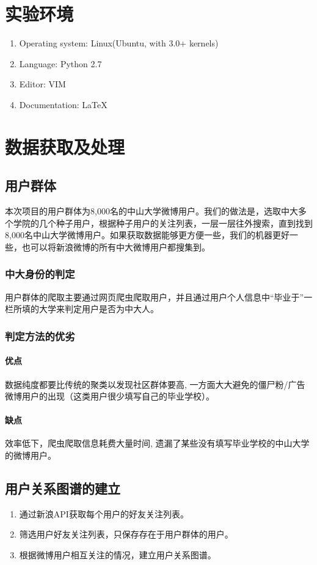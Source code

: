 \documentclass[a4paper]{article}
\begin{document}
\section{实验环境}
\begin{enumerate}
    \item Operating system: Linux(Ubuntu, with 3.0+ kernels)
    \item Language: Python 2.7
    \item Editor: VIM
    \item Documentation: \LaTeX
\end{enumerate}



\section{数据获取及处理}
\subsection{用户群体}
本次项目的用户群体为8,000名的中山大学微博用户。我们的做法是，选取中大多个学院的几个种子用户，根据种子用户的关注列表，一层一层往外搜索，直到找到8,000名中山大学微博用户。如果获取数据能够更方便一些，我们的机器更好一些，也可以将新浪微博的所有中大微博用户都搜集到。
\subsubsection{中大身份的判定}
用户群体的爬取主要通过网页爬虫爬取用户，并且通过用户个人信息中“毕业于”一栏所填的大学来判定用户是否为中大人。
\subsubsection{判定方法的优劣}
\paragraph{优点}数据纯度都要比传统的聚类以发现社区群体要高, 一方面大大避免的僵尸粉/广告微博用户的出现（这类用户很少填写自己的毕业学校）。
\paragraph{缺点}效率低下，爬虫爬取信息耗费大量时间, 遗漏了某些没有填写毕业学校的中山大学的微博用户。

\subsection{用户关系图谱的建立}
\begin{enumerate}
    \item 通过新浪API获取每个用户的好友关注列表。
    \item 筛选用户好友关注列表，只保存存在于用户群体的用户。
    \item 根据微博用户相互关注的情况，建立用户关系图谱。
\end{enumerate}
\end{document}
